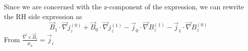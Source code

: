 \documentclass{article}
\begin{document}
Since we are concerned with the z-component of the expression, we can rewrite the RH side expression as
\begin{equation}
    \vec{B}_1 \cdot \vec{\nabla} j_z^{(0)} + \vec{B}_0 \cdot \vec{\nabla} j_z^{(1)} - \vec{j}_0 \cdot \vec{\nabla} B_z^{(1)} - \vec{j}_1 \cdot \vec{\nabla} B_z^{(0)}
\end{equation} 
From $\frac{\vec{\nabla} \times \vec{B}_i}{\mu_0}=\vec{j}_i$
\end{document}

